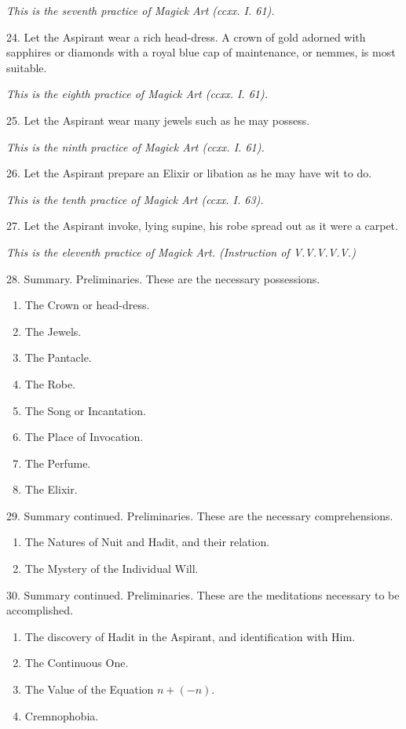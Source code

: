 \textit{This is the seventh practice of Magick Art (ccxx. I. 61).}

24. Let the Aspirant wear a rich head-dress. A crown of gold adorned with sapphires or diamonds with a royal blue cap of maintenance, or nemmes, is most suitable.

\textit{This is the eighth practice of Magick Art (ccxx. I. 61).}

25. Let the Aspirant wear many jewels such as he may possess.

\textit{This is the ninth practice of Magick Art (ccxx. I. 61).}

26. Let the Aspirant prepare an Elixir or libation as he may have wit to do.

\textit{This is the tenth practice of Magick Art (ccxx. I. 63).}

27. Let the Aspirant invoke, lying supine, his robe spread out as it were a carpet.

\textit{This is the eleventh practice of Magick Art. (Instruction of V.V.V.V.V.)}

28. Summary. Preliminaries. These are the necessary possessions.
\begin{enumerate}[leftmargin=4\parindent]
\item The Crown or head-dress.
\item The Jewels.
\item The Pantacle.
\item The Robe.
\item The Song or Incantation.
\item The Place of Invocation.
\item The Perfume.
\item The Elixir.
\end{enumerate}

29. Summary continued. Preliminaries. These are the necessary comprehensions.

\begin{enumerate}[leftmargin=4\parindent]
\item The Natures of Nuit and Hadit, and their relation.
\item The Mystery of the Individual Will.
\end{enumerate}

30. Summary continued. Preliminaries. These are the meditations necessary to be accomplished.
\begin{enumerate}[leftmargin=4\parindent]
\item The discovery of Hadit in the Aspirant, and identification with Him.
\item The Continuous One.
\item The Value of the Equation $n + (-n)$.
\item Cremnophobia.
\end{enumerate}

